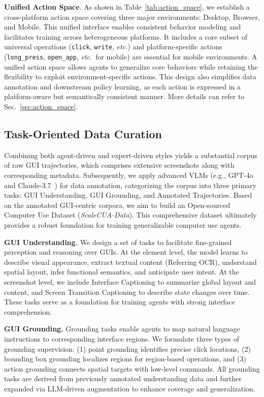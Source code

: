 \documentclass{article} %
\def\ourdataset{ScaleCUA-Data\xspace}
\def\etc{\emph{etc.}}
\begin{document}
\textbf{Unified Action Space}. As shown in Table~\ref{tab:action_space}, we establish a cross-platform action space covering three major environments: Desktop, Browser, and Mobile. This unified interface enables consistent behavior modeling and facilitates training across heterogeneous platforms. It includes a core subset of universal operations (\texttt{click}, \texttt{write}, \etc) and platform-specific actions (\texttt{long\_press}, \texttt{open\_app}, \etc\ for mobile) are essential for mobile environments.
A unified action space allows agents to generalize core behaviors while retaining the flexibility to exploit environment-specific actions. This design also simplifies data annotation and downstream policy learning, as each action is expressed in a platform-aware but semantically consistent manner. More details can refer to Sec.~\ref{sec:action_space}.

\subsection{Task-Oriented Data Curation}
Combining both agent-driven and expert-driven styles yields a substantial corpus of raw GUI trajectories, which comprises extensive screenshots along with corresponding metadata. Subsequently, we apply advanced VLMs (e.g., GPT-4o~\citep{hurst2024gpt} and Claude-3.7~\citep{anthropic2025claude37}) for data annotation, categorizing the corpus into three primary tasks: GUI Understanding, GUI Grounding, and Annotated Trajectories. 
Based on the annotated GUI-centric corpora, we aim to build an Open-sourced Computer Use Dataset (\textit{\ourdataset}).
This comprehensive dataset ultimately provides a robust foundation for training generalizable computer use agents.


\textbf{GUI Understanding.}
We design a set of tasks to facilitate fine-grained perception and reasoning over GUIs. At the element level, the model learns to describe visual appearance, extract textual content (Referring OCR), understand spatial layout, infer functional semantics, and anticipate user intent. At the screenshot level, we include Interface Captioning to summarize global layout and content, and Screen Transition Captioning to describe state changes over time. These tasks serve as a foundation for training agents with strong interface comprehension.

\textbf{GUI Grounding.}
Grounding tasks enable agents to map natural language instructions to corresponding interface regions. We formulate three types of grounding supervision: (1) point grounding identifies precise click locations, (2) bounding box grounding localizes regions for region-based operations, and (3) action grounding connects spatial targets with low-level commands. All grounding tasks are derived from previously annotated understanding data and further expanded via LLM-driven augmentation to enhance coverage and generalization.
\end{document}
